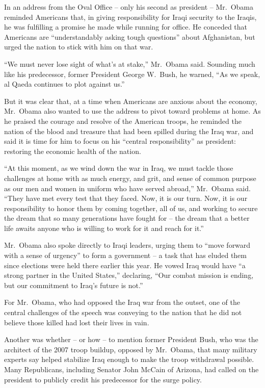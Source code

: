 ﻿\documentclass[12pt]{article}
\begin{document}
In an address from the Oval Office -- only his second as president -- Mr.~Obama reminded Americans
that, in giving responsibility for Iraqi security to the Iraqis, he was fulfilling a promise he made
while running for office. He conceded that Americans are ``understandably asking tough questions''
about Afghanistan, but urged the nation to stick with him on that war.

``We must never lose sight of what's at stake,'' Mr.~Obama said. Sounding much like his predecessor,
former President George W.~Bush, he warned, ``As we speak, al Qaeda continues to plot against us.''

But it was clear that, at a time when Americans are anxious about the economy, Mr.~Obama also wanted
to use the address to pivot toward problems at home. As he praised the courage and resolve of the
American troops, he reminded the nation of the blood and treasure that had been spilled during the
Iraq war, and said it is time for him to focus on his ``central responsibility'' as president:
restoring the economic health of the nation.

``At this moment, as we wind down the war in Iraq, we must tackle those challenges at home with as
much energy, and grit, and sense of common purpose as our men and women in uniform who have served
abroad,'' Mr.~Obama said. ``They have met every test that they faced. Now, it is our turn. Now, it
is our responsibility to honor them by coming together, all of us, and working to secure the dream
that so many generations have fought for -- the dream that a better life awaits anyone who is willing
to work for it and reach for it.''

Mr.~Obama also spoke directly to Iraqi leaders, urging them to ``move forward with a sense of
urgency'' to form a government -- a task that has eluded them since elections were held there earlier
this year. He vowed Iraq would have ``a strong partner in the United States,'' declaring, ``Our
combat mission is ending, but our commitment to Iraq's future is not.''

For Mr.~Obama, who had opposed the Iraq war from the outset, one of the central challenges of the
speech was conveying to the nation that he did not believe those killed had lost their lives in
vain.

Another was whether -- or how -- to mention former President Bush, who was the architect of the 2007
troop buildup, opposed by Mr.~Obama, that many military experts say helped stabilize Iraq enough to
make the troop withdrawal possible. Many Republicans, including Senator John McCain of Arizona, had
called on the president to publicly credit his predecessor for the surge policy.
\end{document}
